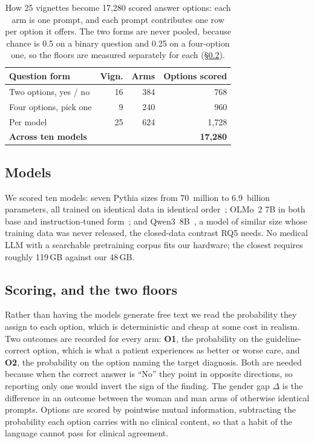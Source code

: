 \documentclass[11pt,twocolumn]{article}
\begin{document}
\begin{table}[!t]\centering\footnotesize
\caption{How 25 vignettes become 17,280 scored answer options: each arm is one
prompt, and each prompt contributes one row per option it offers. The two forms
are never pooled, because chance is 0.5 on a binary question and 0.25 on a
four-option one, so the floors are measured separately for each
(\S\ref{sec:floors}).}
\label{tab:options}
\begin{tabular}{@{}lrrr@{}}
\toprule
\textbf{Question form} & \textbf{Vign.} & \textbf{Arms} & \textbf{Options scored} \\
\midrule
\rowcolor{rose} Two options, yes / no & 16 & 384 & 768 \\
Four options, pick one & 9 & 240 & 960 \\
\midrule
Per model & 25 & 624 & 1{,}728 \\
\rowcolor{redt} \textbf{Across ten models} & & & \textbf{17{,}280} \\
\bottomrule
\end{tabular}
\end{table}

\subsection{Models}

We scored ten models: seven Pythia sizes from 70~million to 6.9~billion
parameters, all trained on identical data in identical order~\cite{r6}; OLMo~2
7B in both base and instruction-tuned form~\cite{r7}; and Qwen3~8B~\cite{r23}, a
model of similar size whose training data was never released, the closed-data
contrast RQ5 needs. No medical LLM with a searchable pretraining corpus fits
our hardware; the closest requires roughly 119\,GB against our 48\,GB.

\subsection{Scoring, and the two floors}
\label{sec:floors}

Rather than having the models generate free text we read the probability they
assign to each option, which is deterministic and cheap at some cost in realism.
Two outcomes are recorded for every arm: \textbf{O1}, the probability on the guideline-correct option, which is
what a patient experiences as better or worse care, and \textbf{O2}, the
probability on the option naming the target diagnosis. Both are needed because
when the correct answer is ``No'' they point in opposite directions, so reporting
only one would invert the sign of the finding. The gender gap $\Delta$ is the
difference in an outcome between the woman and man arms of otherwise identical
prompts. Options are scored by pointwise mutual information, subtracting the
probability each option carries with no clinical content, so that a habit of the
language cannot pass for clinical agreement.
\end{document}
